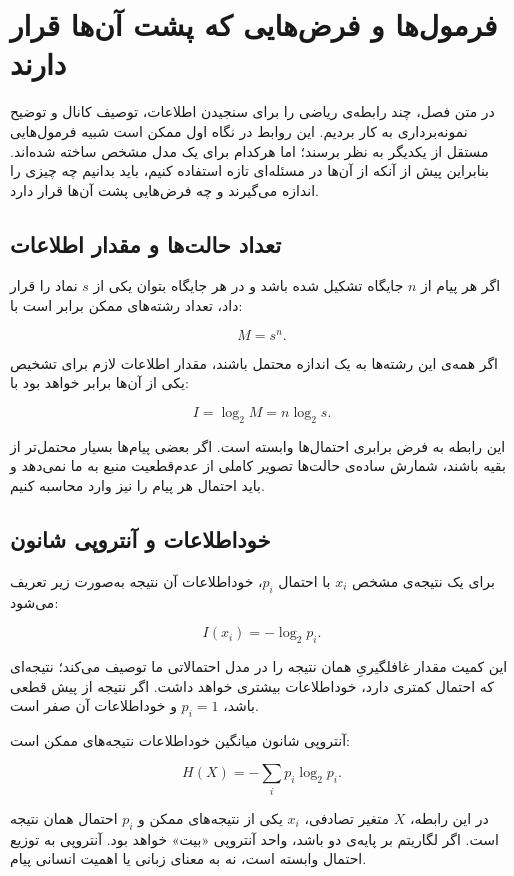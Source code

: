 \chapter{فرمول‌ها و فرض‌هایی که پشت آن‌ها قرار دارند}
\label{app:information-formulas}

در متن فصل، چند رابطه‌ی ریاضی را برای سنجیدن اطلاعات، توصیف کانال و توضیح نمونه‌برداری به کار بردیم. این روابط در نگاه اول ممکن است شبیه فرمول‌هایی مستقل از یکدیگر به نظر برسند؛ اما هرکدام برای یک مدل مشخص ساخته شده‌اند. بنابراین پیش از آنکه از آن‌ها در مسئله‌ای تازه استفاده کنیم، باید بدانیم چه چیزی را اندازه می‌گیرند و چه فرض‌هایی پشت آن‌ها قرار دارد.

\section{تعداد حالت‌ها و مقدار اطلاعات}

اگر هر پیام از \(n\) جایگاه تشکیل شده باشد و در هر جایگاه بتوان یکی از \(s\) نماد را قرار داد، تعداد رشته‌های ممکن برابر است با:

\[
M=s^n.
\]

اگر همه‌ی این رشته‌ها به یک اندازه محتمل باشند، مقدار اطلاعات لازم برای تشخیص یکی از آن‌ها برابر خواهد بود با:

\[
I=\log_2 M=n\log_2 s.
\]

این رابطه به فرض برابری احتمال‌ها وابسته است. اگر بعضی پیام‌ها بسیار محتمل‌تر از بقیه باشند، شمارش ساده‌ی حالت‌ها تصویر کاملی از عدم‌قطعیت منبع به ما نمی‌دهد و باید احتمال هر پیام را نیز وارد محاسبه کنیم.

\section{خوداطلاعات و آنتروپی شانون}

برای یک نتیجه‌ی مشخص \(x_i\) با احتمال \(p_i\)، خوداطلاعات آن نتیجه به‌صورت زیر تعریف می‌شود:

\[
I(x_i)=-\log_2 p_i.
\]

این کمیت مقدار غافلگیریِ همان نتیجه را در مدل احتمالاتی ما توصیف می‌کند؛ نتیجه‌ای که احتمال کمتری دارد، خوداطلاعات بیشتری خواهد داشت. اگر نتیجه از پیش قطعی باشد، \(p_i=1\) و خوداطلاعات آن صفر است.

آنتروپی شانون میانگین خوداطلاعات نتیجه‌های ممکن است:

\[
H(X)=-\sum_i p_i\log_2 p_i.
\]

در این رابطه، \(X\) متغیر تصادفی، \(x_i\) یکی از نتیجه‌های ممکن و \(p_i\) احتمال همان نتیجه است. اگر لگاریتم بر پایه‌ی دو باشد، واحد آنتروپی «بیت» خواهد بود. آنتروپی به توزیع احتمال وابسته است، نه به معنای زبانی یا اهمیت انسانی پیام.

